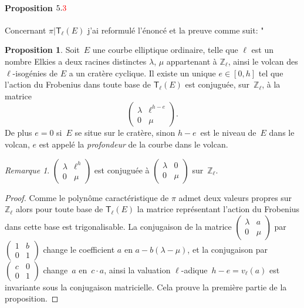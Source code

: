 \documentclass[10pt,a4paper]{article}
\theoremstyle{plain}
\theoremstyle{definition}
\theoremstyle{definition}
\theoremstyle{definition}
\theoremstyle{definition}
\newtheorem{prop}[thm]{Proposition}
\theoremstyle{definition}
\theoremstyle{remark}
\newtheorem{rem}[thm]{Remarque}
\theoremstyle{remark}
\theoremstyle{definition}
\begin{document}
\paragraph{Proposition $5.\color{red}3$}{Concernant $\pi | \mathsf{T}_{\ell}(E)$ j'ai reformulé l'énoncé et la preuve comme suit:
"
\begin{prop}\label{pro:mat:fro}
Soit~$E$ une courbe elliptique ordinaire, telle que $\ell$ est un nombre Elkies
a deux racines distinctes $\lambda$, $\mu$ appartenant à $\mathbb{Z}_{\ell}$,
ainsi le volcan des $\ell$-isogénies de $E$ a un cratère cyclique.
Il existe un unique $e \in [ 0, h]$ tel que 
l'action du Frobenius dans toute base de $\mathsf{T}_{\ell}(E)$  
est conjuguée, sur~$\mathbb{Z}_{\ell}$,
à la matrice 
\begin{equation*}
\left ( \begin{matrix}\lambda & \ell^{h-e} \\ 0 & \mu
\end{matrix}\right ).
\end{equation*}
De plus $e = 0$ si~$E$ se situe sur le cratère,
sinon $h - e$~est le niveau de~$E$ dans le volcan, $e$ est appelé la \emph{profondeur}
de la courbe dans le volcan.
\end{prop}

\begin{rem}
$\left(\begin{smallmatrix} \lambda & \ell^h \\ 0 &
\mu \end{smallmatrix}\right)$ est conjuguée à $\left(\begin{smallmatrix} \lambda & 0 \\ 0 & \mu\end{smallmatrix}\right)$ sur~$\mathbb{Z}_{\ell}$.
\end{rem}

\begin{proof}
Comme le polynôme caractéristique de $\pi$ admet deux valeurs propres sur 
$\mathbb{Z}_{\ell}$ alors pour toute base de $\mathsf{T}_{\ell}(E)$ la matrice
représentant l'action du Frobenius dans cette base est trigonalisable. %
La conjugaison de la matrice $\left ( \begin{smallmatrix}\lambda & a\\0 & \mu
\end{smallmatrix}\right )$ par~$\left ( \begin{smallmatrix}1 & b\\0 & 1
\end{smallmatrix} \right )$ change le coefficient $a$ en $a-b (\lambda - \mu)$, 
et la conjugaison par ~$\left(\begin{smallmatrix} c & 0 \\ 0 &
1\end{smallmatrix}\right)$ change~$a$ en~$c \cdot a$,
ainsi la valuation $\ell$-adique~$h-e = v_{\ell}(a)$ est invariante sous la 
conjugaison matricielle. Cela prouve la première partie de la proposition. 


\end{proof}}
\end{document}
